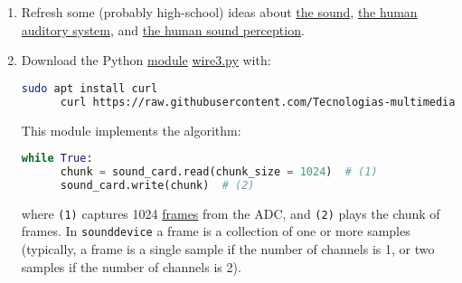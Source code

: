 \begin{enumerate}

\item Refresh some (probably high-school) ideas about
  \href{https://vicente-gonzalez-ruiz.github.io/the_sound/}{the
    sound}, \href{https://vicente-gonzalez-ruiz.github.io/human_auditory_system/}{the
    human auditory system},
    and \href{https://vicente-gonzalez-ruiz.github.io/human_sound_perception/}{the
    human sound perception}. %
  
\item Download the Python
  \href{https://docs.python.org/3/tutorial/modules.html}{module}
  \href{https://raw.githubusercontent.com/Tecnologias-multimedia/intercom/master/test/sounddevice/wire3.py}{wire3.py} with:

  \begin{lstlisting}[language=Bash]
      sudo apt install curl
      curl https://raw.githubusercontent.com/Tecnologias-multimedia/intercom/master/test/sounddevice/wire3.py > wire3.py
  \end{lstlisting}      
      
  This module implements the algorithm:

  \begin{lstlisting}[language=Python]
    while True:
      chunk = sound_card.read(chunk_size = 1024)  # (1)
      sound_card.write(chunk)  # (2)
  \end{lstlisting}
  

  where \texttt{(1)} captures 1024
  \href{https://python-sounddevice.readthedocs.io/en/0.3.12/api.html}{frames}
  from the ADC, and \texttt{(2)} plays the chunk of frames. In
  \texttt{sounddevice} a frame is a collection of one or more samples
  (typically, a frame is a single sample if the number of channels is
  1, or two samples if the number of channels is 2).


\end{enumerate}

